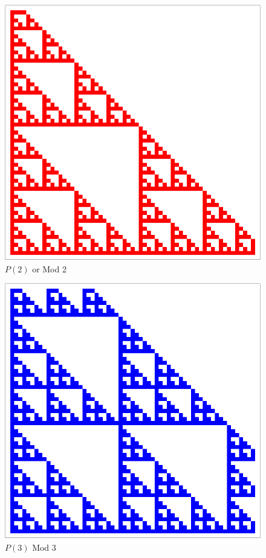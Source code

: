 \documentclass{beamer}
\begin{document}
\begin{frame}
    \begin{figure}
        \centering
        \begin{minipage}[c]{.45\textwidth}
            \includegraphics[width=1\linewidth,clip]{mod6Initalmod2.pdf}
            \centering
            $P(2)$ or Mod 2
        \end{minipage}
        \hfill
        \begin{minipage}[c]{.45\textwidth}
            \includegraphics[width=1\linewidth,clip]{Mod6InitalMod3.pdf}
            \centering
            $P(3)$ Mod 3
        \end{minipage}
    \end{figure}
\end{frame}
\end{document}
